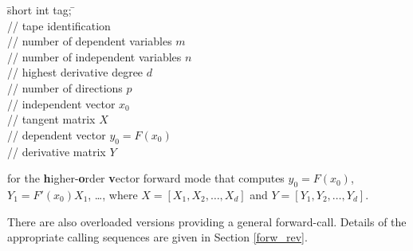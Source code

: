 \documentclass[11pt,twoside]{article}
\begin{document}
\begin{tabbing}
\hspace{0.5in}\={\sf short int tag;} \hspace{1.1in}\= \kill    %
\\
         \> // tape identification \\
                 \> // number of  dependent variables $m$\\
                 \> // number of independent variables $n$\\
                 \> // highest derivative degree $d$\\
                 \> // number of directions $p$\\
          \> // independent vector $x_0$\\
     \> // tangent matrix $X$\\
          \> // dependent vector $y_0=F(x_0)$\\
     \> // derivative matrix $Y$
\end{tabbing}
for the  {\bf h}igher-{\bf o}rder {\bf v}ector forward mode that computes
$y_0=F(x_0)$, $Y_1=F'(x_0)X_1$, \ldots, where $X=[X_1,X_2,\ldots,X_d]$ and  
$Y=[Y_1,Y_2,\ldots,Y_d]$. 

There are also overloaded versions providing a general {\sf forward}-call.
Details of the appropriate calling sequences are given in Section \ref{forw_rev}.
\end{document}
